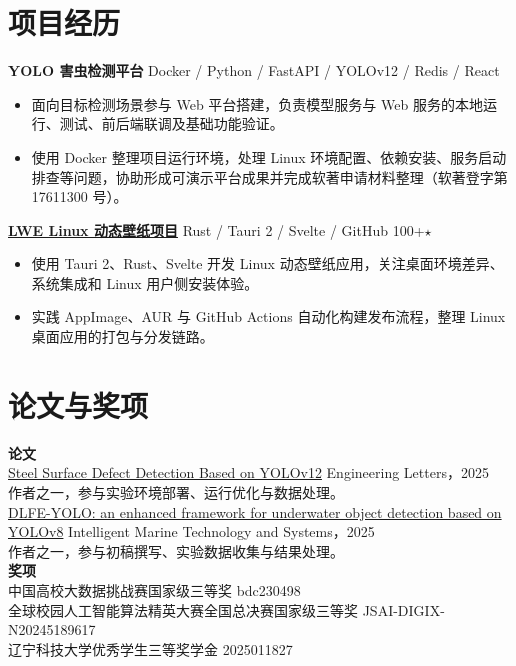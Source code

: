 \documentclass[10pt,a4paper,fontset=none]{ctexart}
\newcommand{\resumeSection}[1]{%
  \section*{#1}%
  \vspace{-0.35em}{\color{rulegray}\hrule height 0.5pt}\vspace{0.2em}%
}
\newcommand{\resumeSubheading}[2]{%
  \textbf{#1} \hfill {\small #2}\par
}
\newcommand{\resumeItemListStart}{\begin{itemize}}
\newcommand{\resumeItemListEnd}{\end{itemize}}
\newcommand{\resumeItem}[1]{\item {\small #1}}
\begin{document}
\resumeSection{项目经历}
\resumeSubheading{YOLO 害虫检测平台}{Docker / Python / FastAPI / YOLOv12 / Redis / React}
\resumeItemListStart
  \resumeItem{面向目标检测场景参与 Web 平台搭建，负责模型服务与 Web 服务的本地运行、测试、前后端联调及基础功能验证。}
  \resumeItem{使用 Docker 整理项目运行环境，处理 Linux 环境配置、依赖安装、服务启动排查等问题，协助形成可演示平台成果并完成软著申请材料整理（软著登字第 17611300 号）。}
\resumeItemListEnd

\resumeSubheading{\href{https://github.com/YangYuS8/lwe}{LWE Linux 动态壁纸项目}}{Rust / Tauri 2 / Svelte / GitHub 100+\ensuremath{\star}}
\resumeItemListStart
  \resumeItem{使用 Tauri 2、Rust、Svelte 开发 Linux 动态壁纸应用，关注桌面环境差异、系统集成和 Linux 用户侧安装体验。}
  \resumeItem{实践 AppImage、AUR 与 GitHub Actions 自动化构建发布流程，整理 Linux 桌面应用的打包与分发链路。}
\resumeItemListEnd

\resumeSection{论文与奖项}
{\small
\textbf{论文}\\[-0.15em]
\href{https://www.engineeringletters.com/issues_v33/issue_12/EL_33_12_08.pdf}{Steel Surface Defect Detection Based on YOLOv12} \hfill Engineering Letters，2025\\[-0.1em]
作者之一，参与实验环境部署、运行优化与数据处理。\\[0.25em]
\href{https://link.springer.com/article/10.1007/s44295-025-00088-x}{DLFE-YOLO: an enhanced framework for underwater object detection based on YOLOv8} \hfill Intelligent Marine Technology and Systems，2025\\[-0.1em]
作者之一，参与初稿撰写、实验数据收集与结果处理。\\[0.35em]
\textbf{奖项}\\[-0.15em]
中国高校大数据挑战赛国家级三等奖 \hfill bdc230498\\[-0.05em]
全球校园人工智能算法精英大赛全国总决赛国家级三等奖 \hfill JSAI-DIGIX-N20245189617\\[-0.05em]
辽宁科技大学优秀学生三等奖学金 \hfill 2025011827
}
\end{document}
